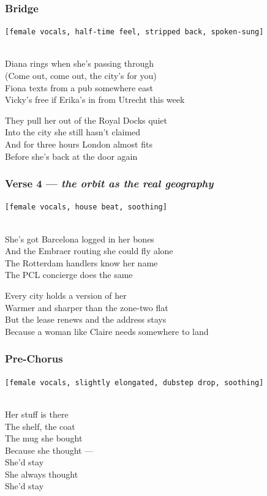 \documentclass[]{article}
\begin{document}
\subsubsection{Bridge}\label{bridge-24}

\texttt{{[}female\ vocals,\ half-time\ feel,\ stripped\ back,\ spoken-sung{]}}\strut \\
Diana rings when she's passing through\\
(Come out, come out, the city's for you)\\
Fiona texts from a pub somewhere east\\
Vicky's free if Erika's in from Utrecht this week

They pull her out of the Royal Docks quiet\\
Into the city she still hasn't claimed\\
And for three hours London almost fits\\
Before she's back at the door again

\subsubsection{\texorpdfstring{Verse 4 --- \emph{the orbit as the real
geography}}{Verse 4 --- the orbit as the real geography}}\label{verse-4-the-orbit-as-the-real-geography}

\texttt{{[}female\ vocals,\ house\ beat,\ soothing{]}}\strut \\
She's got Barcelona logged in her bones\\
And the Embraer routing she could fly alone\\
The Rotterdam handlers know her name\\
The PCL concierge does the same

Every city holds a version of her\\
Warmer and sharper than the zone-two flat\\
But the lease renews and the address stays\\
Because a woman like Claire needs somewhere to land

\subsubsection{Pre-Chorus}\label{pre-chorus-57}

\texttt{{[}female\ vocals,\ slightly\ elongated,\ dubstep\ drop,\ soothing{]}}\strut \\
Her stuff is there\\
The shelf, the coat\\
The mug she bought\\
Because she thought ---\\
She'd stay\\
She always thought\\
She'd stay
\end{document}
